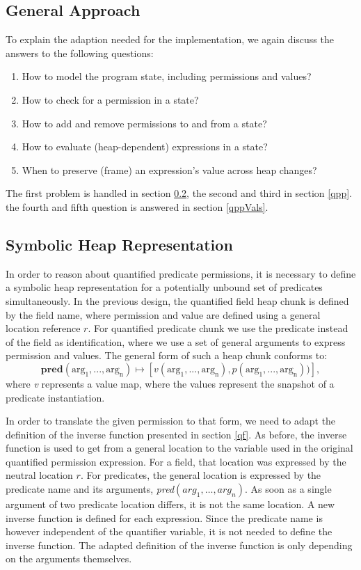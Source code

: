 \documentclass[12pt]{article}
\begin{document}
\subsection{General Approach}
To explain the adaption needed for the implementation, we again discuss the answers to the following questions:
\begin{enumerate}
\item How to model the program state, including permissions and values?
\item How to check for a permission in a state?
\item How to add and remove permissions to and from a state?
\item How to evaluate (heap-dependent) expressions in a state?
\item When to preserve (frame) an expression's value across heap changes?
\end{enumerate}

The first problem is handled in section \ref{shr}, the second and third in section \ref{qpp}. the fourth and fifth question is answered  in section \ref{qppVals}. 

\subsection{Symbolic Heap Representation} \label{shr}
In order to reason about quantified predicate permissions, it is necessary to define a symbolic heap representation for a potentially unbound set of predicates simultaneously. In the previous design, the quantified field heap chunk is defined by the field name, where permission and value are defined using a general location reference \(r\).
For quantified predicate chunk we use the predicate instead of the field as identification, where we use a set of general arguments to express permission and values. The general form of such a heap chunk conforms to:
\begin{equation}
	\mathbf{pred}(\mathrm{arg_1, ..., arg_n})\mapsto [v(\mathrm{arg_1, ..., arg_n}), p(\mathrm{arg_1, ..., arg_n}))],
\end{equation}
where \textit{v} represents a value map, where the values represent the snapshot of a predicate instantiation.

In order to translate the given permission to that form, we need to adapt the definition of the inverse function presented in section \ref{qf}. As before, the inverse function is used to get from a general location to the variable used in the original quantified permission expression. For a field, that location was expressed by the neutral location \(r\). For predicates, the general location is expressed by the predicate name and its arguments, \textit{pred}\((arg_1, \dots, arg_n)\). As soon as a single argument of two predicate location differs, it is not the same location.
A new inverse function is defined for each expression. Since the predicate name is however independent of the quantifier variable, it is not needed to define the inverse function. The adapted definition of the inverse function is only depending on the arguments themselves.
\end{document}
